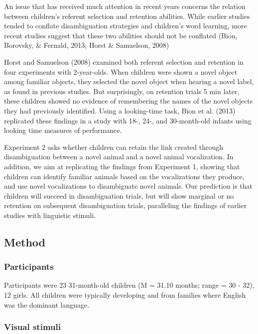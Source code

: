 \documentclass[english,floatsintext,man]{apa6}
\theoremstyle{definition}
\theoremstyle{definition}
\theoremstyle{definition}
\theoremstyle{remark}
\begin{document}
An issue that has received much attention in recent years concerns the
relation between children's referent selection and retention abilities.
While earlier studies tended to conflate disambiguation strategies and
children's word learning, more recent studies suggest that these two
abilities should not be conflated (Bion, Borovsky, \& Fernald, 2013;
Horst \& Samuelson, 2008)

Horst and Samuelson (2008) examined both referent selection and
retention in four experiments with 2-year-olds. When children were shown
a novel object among familiar objects, they selected the novel object
when hearing a novel label, as found in previous studies. But
surprisingly, on retention trials 5 min later, these children showed no
evidence of remembering the names of the novel objects they had
previously identified. Using a looking-time task, Bion et al. (2013)
replicated these findings in a study with 18-, 24-, and 30-month-old
infants using looking time measures of performance.

Experiment 2 asks whether children can retain the link created through
disambiguation between a novel animal and a novel animal vocalization.
In addition, we aim at replicating the findings from Experiment 1,
showing that children can identify familiar animals based on the
vocalizations they produce, and use novel vocalizations to disambiguate
novel animals. Our prediction is that children will succeed in
disambiguation trials, but will show marginal or no retention on
subsequent disambiguation trials, paralleling the findings of earlier
studies with linguistic stimuli.

\hypertarget{method-1}{%
\subsection{Method}\label{method-1}}

\hypertarget{participants-1}{%
\subsubsection{Participants}\label{participants-1}}

Participants were 23 31-month-old children (M = 31.10 months; range = 30
- 32), 12 girls. All children were typically developing and from
families where English was the dominant language.

\hypertarget{visual-stimuli-1}{%
\subsubsection{Visual stimuli}\label{visual-stimuli-1}}
\end{document}
